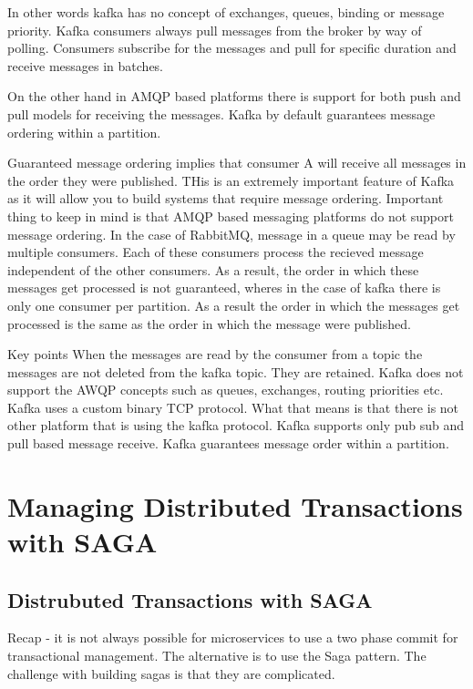 \documentclass[a4paper, 11pt]{book}
\begin{document}
    In other words kafka has no concept of exchanges, queues, binding or message priority.
    Kafka consumers always pull messages from the broker by way of polling.
    Consumers subscribe for the messages and pull for specific duration and receive messages in batches.

    On the other hand in AMQP based platforms there is support for both push and pull models for receiving the messages.
    Kafka by default guarantees message ordering within a partition.

    Guaranteed message ordering implies that consumer A will receive all messages in the order they were published.
    THis is an extremely important feature of Kafka as it will allow you to build systems that require message ordering.
    Important thing to keep in mind is that AMQP based messaging platforms do not support message ordering.
    In the case of RabbitMQ, message in a queue may be read by multiple consumers.
    Each of these consumers process the recieved message independent of the other consumers.
    As a result, the order in which these messages get processed is not guaranteed, wheres in the case of kafka there is only one consumer per partition.
    As a result the order in which the messages get processed is the same as the order in which the message were published.

    Key points
    When the messages are read by the consumer from a topic the messages are not deleted from the kafka topic. They are retained.
    Kafka does not support the AWQP concepts such as queues, exchanges, routing priorities etc.
    Kafka uses a custom binary TCP protocol.
    What that means is that there is not other platform that is using the kafka protocol.
    Kafka supports only pub sub and pull based message receive.
    Kafka guarantees message order within a partition.



    \chapter{Managing Distributed Transactions with SAGA}


    \section{Distrubuted Transactions with SAGA}
    Recap - it is not always possible for microservices to use a two phase commit for transactional management.
    The alternative is to use the Saga pattern.
    The challenge with building sagas is that they are complicated.
\end{document}

